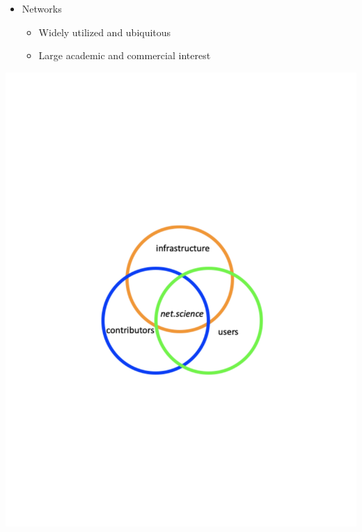 \documentclass[landscape,paperwidth=70in,paperheight=46in,fontscale=0.225]{baposter} %
\begin{document}
\begin{poster}
{\begin{minipage}{.75\textwidth}
\begin{itemize}[leftmargin=*,noitemsep,topsep=0pt]
\item Networks
	\begin{itemize}
	\item Widely utilized and ubiquitous
	\item Large academic and commercial interest
	\end{itemize}
\end{itemize}
 \end{minipage}       
\hfill
\begin{minipage}{.2\textwidth}
\includegraphics[scale=0.17]{figures/motivation.pdf}
\end{minipage}

}
\end{poster}
\end{document}

